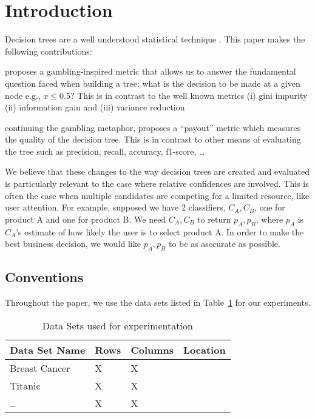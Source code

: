 \newcommand{\extra}{0}

\section{Introduction}

Decision trees are a well understood statistical technique \cite{Hastie2009}.
This paper makes the following contributions:
\be
\item proposes a gambling-inspired metric that allows us to answer
the fundamental question faced when building a tree: 
what is the decision to be made at a given node e.g., \(x \leq 0.5?\)
This is in contrast to the well known metrics (i) gini impurity (ii) information
gain and (iii) variance reduction
\item continuing the gambling metaphor, proposes a ``payout'' metric which
measures the quality of the decision tree. This is in contrast to other means of
evaluating the tree such as precision, recall, accuracy, f1-score, \ldots
\ee

We believe that these changes to the way decision trees are created and
evaluated is particularly relevant to the case where relative
confidences are involved. This is often the case when multiple candidates are
competing for a limited resource, like user attention. 
For example, supposed we have 2 classifiers, \(C_A, C_B\), one for product A and one for
product B.  We need \(C_A, C_B\) to return \(p_A, p_B\), where \(p_A\) is
\(C_A\)'s estimate of how likely the user is to select product A. In order to
make the best business decision, we would like \(p_A, p_B\) to be as asccurate
as possible.

\subsection{Conventions}
Throughout the paper, we use the data sets listed in Table~\ref{tbl_data_sets}
for our experiments. 
\begin{table}
\centering
\begin{tabular}{|l|l|l|l|} \hline \hline
{\bf Data Set Name } & {\bf Rows} & {\bf Columns} & {\bf Location} \\ \hline 
Breast Cancer & X & X & \\ \hline
Titanic & X & X & \\ \hline
\ldots & X & X & \\ \hline
\end{tabular}
\label{tbl_data_sets}
\caption{Data Sets used for experimentation}
\end{table}

